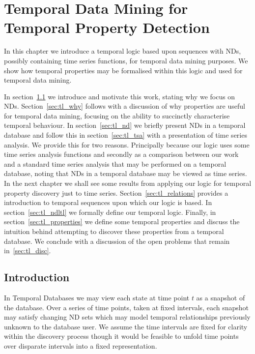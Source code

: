 \chapter{Temporal Data Mining for Temporal Property
Detection}\label{chap:templog}

In this chapter we introduce a temporal logic based upon sequences
with NDs, possibly containing time series functions, for temporal data
mining purposes. We show how temporal properties may be formalised
within this logic and used for temporal data mining.
\smallskip

In section~\ref{sec:tl_intro} we introduce and motivate this
work, stating why we focus on NDs. Section~\ref{sec:tl_why} follows
with a discussion of why
properties are useful for temporal data mining, focusing on the
ability to succinctly characterise temporal behaviour. In
section~\ref{sec:tl_nd} we briefly present NDs in a temporal database
and follow this in section~\ref{sec:tl_tsa} with a presentation of
time series analysis. We provide this for two reasons. Principally
because our logic uses some time series analysis functions and
secondly as a comparison between our work and a standard time series
analysis that may be performed on a temporal database, noting that NDs
in a temporal database may be viewed as time series. In the next
chapter we shall see some results from applying our logic for temporal
property discovery just to time series.  Section~\ref{sec:tl_relations}
provides a introduction to temporal sequences upon which our logic is
based. In section~\ref{sec:tl_ndltl} we formally define our temporal
logic. Finally, in section~\ref{sec:tl_properties} we define some temporal
properties and discuss the intuition behind attempting to discover
these properties from a temporal database. We conclude with a
discussion of the open problems that remain in~\ref{sec:tl_disc}.

\section{Introduction}\label{sec:tl_intro}

In Temporal Databases we
may view each state at time point $t$ as a snapshot of the database. 
Over a series of time points, taken at fixed intervals, each snapshot 
may satisfy changing
ND sets which may model temporal relationships previously unknown to
the database user. We assume the time intervals are fixed for clarity
within the discovery process though it would be feasible to unfold
time points over disparate intervals into a fixed representation.

